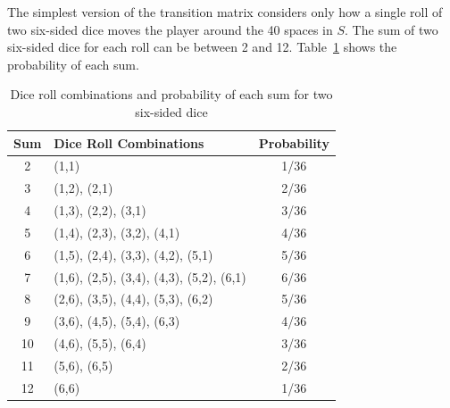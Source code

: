 The simplest version of the transition matrix considers only how a single roll of two six-sided dice moves the player around the 40 spaces in $S$. The sum of two six-sided dice for each roll can be between 2 and 12. Table~\ref{tab:dice} shows the probability of each sum.

\begin{table}[H]
\centering
\begin{tabular}{|c|l|c|}
\hline
\textbf{Sum} & \textbf{Dice Roll Combinations} & \textbf{Probability} \\
\hline
2  & (1,1) & 1/36 \\
\hline
3  & (1,2), (2,1) & 2/36 \\
\hline
4  & (1,3), (2,2), (3,1) & 3/36 \\
\hline
5  & (1,4), (2,3), (3,2), (4,1) & 4/36 \\
\hline
6  & (1,5), (2,4), (3,3), (4,2), (5,1) & 5/36 \\
\hline
7  & (1,6), (2,5), (3,4), (4,3), (5,2), (6,1) & 6/36 \\
\hline
8  & (2,6), (3,5), (4,4), (5,3), (6,2) & 5/36 \\
\hline
9  & (3,6), (4,5), (5,4), (6,3) & 4/36 \\
\hline
10 & (4,6), (5,5), (6,4) & 3/36 \\
\hline
11 & (5,6), (6,5) & 2/36 \\
\hline
12 & (6,6) & 1/36 \\
\hline
\end{tabular}
\caption{Dice roll combinations and probability of each sum for two six-sided dice}
\label{tab:dice}
\end{table}

